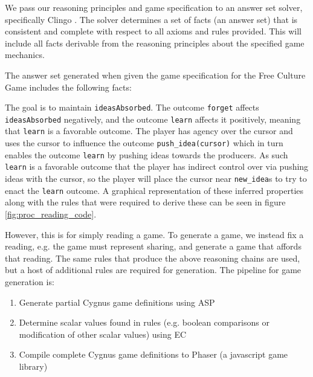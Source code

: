 \documentclass[a4paper]{article}
\begin{document}

We pass our reasoning principles and game specification to an answer set
solver, specifically Clingo \cite{clingo}. The solver determines a set of
facts (an answer set) that is consistent and complete with respect to all
axioms and rules provided. This will include all facts derivable from the reasoning principles about the specified game mechanics.

The answer set generated when given the game specification for the Free
Culture Game includes the following facts:

The goal is to maintain \verb|ideasAbsorbed|. The outcome  \verb|forget|
affects \verb|ideasAbsorbed| negatively, and the outcome \verb|learn|
affects it positively, meaning that \verb|learn| is a favorable outcome.
The player has agency over the cursor and uses the cursor to influence the
outcome \verb|push_idea(cursor)| which in turn enables the outcome
\verb|learn| by pushing ideas towards the producers.  As such \verb|learn|
is a favorable outcome that the player has indirect control over via
pushing ideas with the cursor, so the player will place the cursor  near
\verb|new_idea|s to try to enact the \verb|learn| outcome.  A graphical representation of these inferred properties along with the rules that were required to derive these can be seen in figure \ref{fig:proc_reading_code}.

However, this is for simply reading a game.  To generate a game, we instead fix a reading, e.g. the game must represent sharing, and generate a game that affords that reading.  The same rules that produce the above reasoning chains are used, but a host of additional rules are required for generation.  The pipeline for game generation is:

\begin{enumerate}
\item Generate partial Cygnus game definitions using ASP
\item Determine scalar values found in rules (e.g. boolean comparisons or modification of other scalar values) using EC
\item Compile complete Cygnus game definitions to Phaser (a javascript game library)
\end{enumerate}
\end{document}
